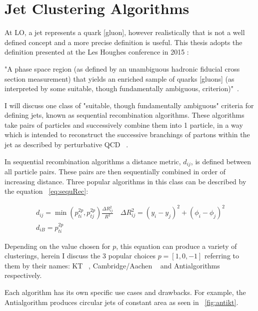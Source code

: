 \section{Jet Clustering Algorithms}\label{secSM:ch1}

At LO, a jet represents a quark [gluon], however realistically that is not a well defined concept and a more precise definition is useful. This thesis adopts the definition presented at the Les Houghes conference in 2015 :\newline

"A phase space region (as defined by an unambiguous hadronic fiducial cross section measurement) that yields an enriched sample of quarks [gluons] (as interpreted by some suitable, though fundamentally ambiguous, criterion)"~\cite{Badger:2016bpw}.\newline 

I will discuss one class of "suitable, though fundamentally ambiguous" criteria for defining jets, known as sequential recombination algorithms. These algorithms take pairs of particles and successively combine them into 1 particle, in a way which is intended to reconstruct the successive branchings of partons within the jet as described by perturbative QCD ~\cite{Marzani:2019hun}.
 
In sequential recombination algorithms a distance metric, $d_{ij}$, is defined between all particle pairs. These pairs are then sequentially combined in order of increasing distance. Three popular algorithms in this class can be described by the equation ~\ref{eq:sequRec}:


\begin{equation}
\begin{array}{l}{d_{i j}=\min \left(p_{t i}^{2 p}, p_{t j}^{2 p}\right) \frac{\Delta R_{i j}^{2}}{R^{2}} \quad \Delta R_{i j}^{2}=\left(y_{i}-y_{j}\right)^{2}+\left(\phi_{i}-\phi_{j}\right)^{2}} \\ {d_{i B}=p_{t i}^{2 p}}\end{array}
\end{equation}\label{eq:sequRec}


Depending on the value chosen for $p$, this equation can produce a variety of clusterings, herein I discuss the 3 popular choices $p = [1, 0, -1]$ referring to them by their names: KT ~\cite{Ellis:1993tq}, Cambridge/Aachen ~\cite{Dokshitzer:1997in} and Anti\kt algorithms ~\cite{Cacciari:2008gp} respectively.

Each algorithm has its own specific use cases and drawbacks. For example, the Anti\kt algorithm produces circular jets of constant area as seen in ~\ref{fig:antikt}. 

